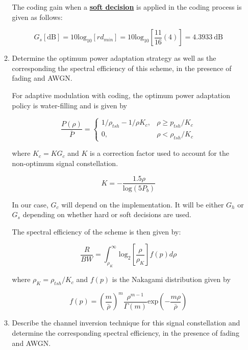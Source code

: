 \documentclass[fleqn]{article}
\begin{document}
\begin{enumerate}
\begin{enumerate}
			The coding gain when a \textbf{\underline{soft decision}} is applied in the coding process is given as follows:
			
			\begin{equation*}
				G_s[\text{dB}] = 10\text{log}_{10}[rd_{min}] = 10\text{log}_10\left[\frac{11}{16}(4)\right] = 4.3933 \ \text{dB}
			\end{equation*}
			
			\item Determine the optimum power adaptation strategy as well as the corresponding the spectral efficiency of this scheme, in the presence of fading and AWGN.
			
			
			For adaptive modulation with coding, the optimum power adaptation policy is water-filling and is given by
			
			\begin{equation*}
				\frac{P(\rho)}{\bar{P}} = \begin{cases}
					1/\rho_{tsh} - 1/\rho K_c, & \rho \geq p_{tsh}/K_c\\
					0, & \rho < \rho_{tsh}/K_c
				\end{cases}
			\end{equation*}
			
			where $K_c = KG_c$ and $K$ is a correction factor used to account for the non-optimum signal constellation.
			
			\begin{equation*}
				K = -\frac{1.5\rho}{\text{log}(5P_b)}
			\end{equation*}
			
			In our case, $G_c$ will depend on the implementation. It will be either $G_h$ or $G_s$ depending on whether hard or soft decisions are used.
			 
			The spectral efficiency of the scheme is then given by:
			
			\begin{equation*}
				\frac{R}{BW} = \int_{\rho_K}^{\infty}{\text{log}_2\left[\frac{\rho}{\rho_K}\right]f(p)d\rho}
			\end{equation*}
			
			where $\rho_K = \rho_{tsh}/K_c$ and $f(p)$ is the Nakagami distribution given by
			
			\begin{equation*}
				f(p) = \left(\frac{m}{\bar{\rho}}\right)^m\frac{\rho^{m-1}}{\Gamma(m)}\text{exp}\left(-\frac{m\rho}{\bar{\rho}}\right)
			\end{equation*}
%			
			\item Describe the channel inversion technique for this signal constellation and determine the corresponding spectral efficiency, in the presence of fading and AWGN.
			

\end{enumerate}
\end{enumerate}
\end{document}
